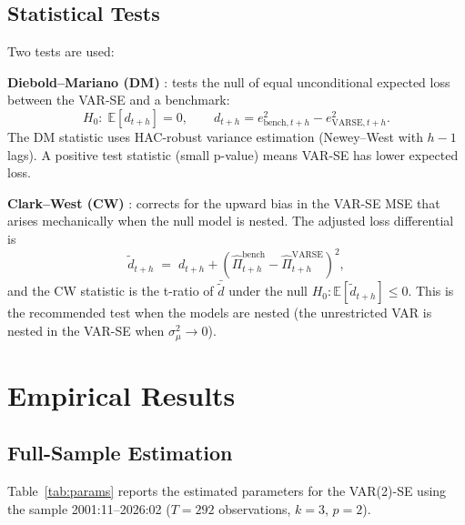 \documentclass[12pt, a4paper]{article}
\newcommand{\E}{\mathbb{E}}
\begin{document}
\subsection{Statistical Tests}

Two tests are used:

\medskip
\noindent\textbf{Diebold--Mariano (DM)} \citep{dm1995}: tests the null of
equal unconditional expected loss between the VAR-SE and a benchmark:
\begin{equation}
    H_0:\; \E\!\left[d_{t+h}\right] = 0,
    \qquad d_{t+h} = e^2_{\text{bench},t+h} - e^2_{\text{VARSE},t+h}.
\end{equation}
The DM statistic uses HAC-robust variance estimation (Newey--West with
$h-1$ lags). A positive test statistic (small p-value) means VAR-SE
has lower expected loss.

\medskip
\noindent\textbf{Clark--West (CW)} \citep{clarkewest2007}: corrects for
the upward bias in the VAR-SE MSE that arises mechanically when the null
model is nested. The adjusted loss differential is
\begin{equation}
    \tilde{d}_{t+h} \;=\; d_{t+h} + \left(\widehat{\Pi}^{\text{bench}}_{t+h} - \widehat{\Pi}^{\text{VARSE}}_{t+h}\right)^2,
\end{equation}
and the CW statistic is the t-ratio of $\bar{\tilde{d}}$ under the null
$H_0: \E[\tilde{d}_{t+h}]\leq 0$. This is the recommended test when the
models are nested (the unrestricted VAR is nested in the VAR-SE when
$\sigma^2_\mu\to 0$).

\section{Empirical Results}
\label{sec:results}

\subsection{Full-Sample Estimation}

Table~\ref{tab:params} reports the estimated parameters for the VAR(2)-SE
using the sample 2001:11--2026:02 ($T=292$ observations, $k=3$, $p=2$).
\end{document}
